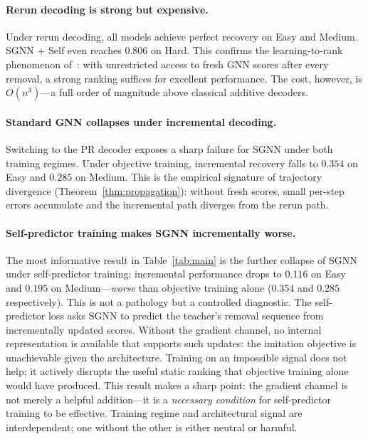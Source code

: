 \documentclass[11pt]{article}
\newcommand{\change}[1]{{\color{red}#1}}
\theoremstyle{plain}
\theoremstyle{definition}
\theoremstyle{remark}
\begin{document}
\paragraph{Rerun decoding is strong but expensive.}
Under rerun decoding, all models achieve perfect recovery on Easy and Medium. SGNN +
Self even reaches $0.806$ on Hard. This confirms the learning-to-rank phenomenon
of~\citet{shoham2026ltr}: with unrestricted access to fresh GNN scores after every
removal, a strong ranking suffices for excellent performance. The cost, however, is
$O(n^3)$---a full order of magnitude above classical additive decoders.

\paragraph{Standard GNN collapses under incremental decoding.}
Switching to the \change{PR} decoder exposes a sharp failure for SGNN under both
training regimes. Under objective training, incremental recovery falls to $0.354$ on
Easy and $0.285$ on Medium. This is the empirical signature of trajectory divergence
(Theorem~\ref{thm:propagation}): without fresh scores, small per-step errors
accumulate and the incremental path diverges from the rerun path.

\paragraph{Self-predictor training makes SGNN incrementally worse.}
The most informative result in Table~\ref{tab:main} is the further collapse of SGNN
under self-predictor training: incremental performance drops to $0.116$ on Easy and
$0.195$ on Medium---\emph{worse} than objective training alone ($0.354$ and $0.285$
respectively). This is not a pathology but a controlled diagnostic. The self-predictor
loss asks SGNN to predict the teacher's removal sequence from incrementally updated
scores. Without the gradient channel, no internal representation is available that
supports such updates: the imitation objective is unachievable given the architecture.
Training on an impossible signal does not help; it actively disrupts the useful static
ranking that objective training alone would have produced. This result makes a sharp
point: the gradient channel is not merely a helpful addition---it is a
\emph{necessary condition} for self-predictor training to be effective. Training
regime and architectural signal are interdependent; one without the other is either
neutral or harmful.
\end{document}
